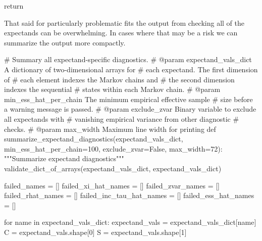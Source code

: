 \documentclass[
  letterpaper,
  DIV=11,
  numbers=noendperiod]{scrartcl}
\newenvironment{Shaded}{\begin{snugshade}}{\end{snugshade}}
\newcommand{\CommentTok}[1]{\textcolor[rgb]{0.37,0.37,0.37}{#1}}
\newcommand{\ControlFlowTok}[1]{\textcolor[rgb]{0.00,0.23,0.31}{#1}}
\newcommand{\DecValTok}[1]{\textcolor[rgb]{0.68,0.00,0.00}{#1}}
\newcommand{\KeywordTok}[1]{\textcolor[rgb]{0.00,0.23,0.31}{#1}}
\newcommand{\NormalTok}[1]{\textcolor[rgb]{0.00,0.23,0.31}{#1}}
\newcommand{\OperatorTok}[1]{\textcolor[rgb]{0.37,0.37,0.37}{#1}}
\newcommand{\StringTok}[1]{\textcolor[rgb]{0.13,0.47,0.30}{#1}}
\newcommand{\VariableTok}[1]{\textcolor[rgb]{0.07,0.07,0.07}{#1}}
\begin{document}
\begin{Shaded}
\begin{Highlighting}[]
  \ControlFlowTok{return}
\end{Highlighting}
\end{Shaded}

That said for particularly problematic fits the output from checking all
of the expectands can be overwhelming. In cases where that may be a risk
we can summarize the output more compactly.

\begin{Shaded}
\begin{Highlighting}[]
\CommentTok{\# Summary all expectand{-}specific diagnostics.}
\CommentTok{\# @param expectand\_vals\_dict A dictionary of two{-}dimensional arrays for}
\CommentTok{\#                            each expectand.  The first dimension of}
\CommentTok{\#                            each element indexes the Markov chains and}
\CommentTok{\#                            the second dimension indexes the sequential}
\CommentTok{\#                            states within each Markov chain.}
\CommentTok{\# @param min\_ess\_hat\_per\_chain The minimum empirical effective sample}
\CommentTok{\#                              size before a warning message is passed.}
\CommentTok{\# @param exclude\_zvar Binary variable to exclude all expectands with}
\CommentTok{\#                     vanishing empirical variance from other diagnostic}
\CommentTok{\#                     checks.}
\CommentTok{\# @param max\_width Maximum line width for printing}
\KeywordTok{def}\NormalTok{ summarize\_expectand\_diagnostics(expectand\_vals\_dict,}
\NormalTok{                                    min\_ess\_hat\_per\_chain}\OperatorTok{=}\DecValTok{100}\NormalTok{,}
\NormalTok{                                    exclude\_zvar}\OperatorTok{=}\VariableTok{False}\NormalTok{,}
\NormalTok{                                    max\_width}\OperatorTok{=}\DecValTok{72}\NormalTok{):}
  \CommentTok{"""Summarize expectand diagnostics"""}
\NormalTok{  validate\_dict\_of\_arrays(expectand\_vals\_dict, }\StringTok{\textquotesingle{}expectand\_vals\_dict\textquotesingle{}}\NormalTok{)}

\NormalTok{  failed\_names }\OperatorTok{=}\NormalTok{ []}
\NormalTok{  failed\_xi\_hat\_names }\OperatorTok{=}\NormalTok{ []}
\NormalTok{  failed\_zvar\_names }\OperatorTok{=}\NormalTok{ []}
\NormalTok{  failed\_rhat\_names }\OperatorTok{=}\NormalTok{ []}
\NormalTok{  failed\_inc\_tau\_hat\_names }\OperatorTok{=}\NormalTok{ []}
\NormalTok{  failed\_ess\_hat\_names }\OperatorTok{=}\NormalTok{ []}

  \ControlFlowTok{for}\NormalTok{ name }\KeywordTok{in}\NormalTok{ expectand\_vals\_dict:}
\NormalTok{    expectand\_vals }\OperatorTok{=}\NormalTok{ expectand\_vals\_dict[name]}
\NormalTok{    C }\OperatorTok{=}\NormalTok{ expectand\_vals.shape[}\DecValTok{0}\NormalTok{]}
\NormalTok{    S }\OperatorTok{=}\NormalTok{ expectand\_vals.shape[}\DecValTok{1}\NormalTok{]}
    

\end{Highlighting}
\end{Shaded}
\end{document}
